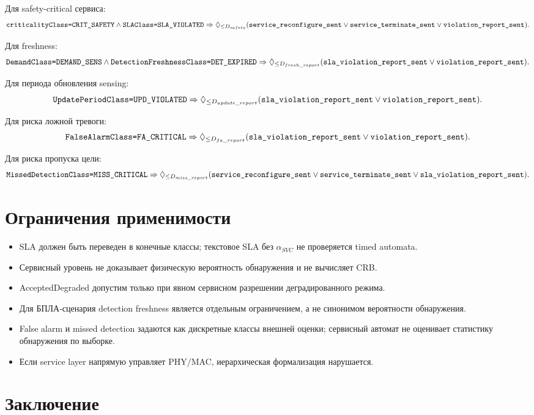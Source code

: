 \documentclass[10pt,a4paper]{article}
\newcommand{\code}[1]{\ifmmode\text{\ttfamily\detokenize{#1}}\else\texttt{\detokenize{#1}}\fi}
\begin{document}
Для safety-critical сервиса:
\[
\code{criticalityClass=CRIT_SAFETY}\land \code{SLAClass=SLA_VIOLATED}\Rightarrow
\Diamond_{\le D_{safety}}
(\code{service_reconfigure_sent}\vee \code{service_terminate_sent}\vee
\code{violation_report_sent}).
\]

Для freshness:
\[
\code{DemandClass=DEMAND_SENS}\land \code{DetectionFreshnessClass=DET_EXPIRED}
\Rightarrow
\Diamond_{\le D_{fresh\_report}}
(\code{sla_violation_report_sent}\vee \code{violation_report_sent}).
\]

Для периода обновления sensing:
\[
\code{UpdatePeriodClass=UPD_VIOLATED}\Rightarrow
\Diamond_{\le D_{update\_report}}
(\code{sla_violation_report_sent}\vee \code{violation_report_sent}).
\]

Для риска ложной тревоги:
\[
\code{FalseAlarmClass=FA_CRITICAL}\Rightarrow
\Diamond_{\le D_{fa\_report}}
(\code{sla_violation_report_sent}\vee \code{violation_report_sent}).
\]

Для риска пропуска цели:
\[
\code{MissedDetectionClass=MISS_CRITICAL}\Rightarrow
\Diamond_{\le D_{miss\_report}}
(\code{service_reconfigure_sent}\vee \code{service_terminate_sent}\vee
\code{sla_violation_report_sent}).
\]

\section{Ограничения применимости}

\begin{itemize}
  \item SLA должен быть переведен в конечные классы; текстовое SLA без \(\alpha_{SVC}\) не проверяется timed automata.
  \item Сервисный уровень не доказывает физическую вероятность обнаружения и не вычисляет CRB.
  \item AcceptedDegraded допустим только при явном сервисном разрешении деградированного режима.
  \item Для БПЛА-сценария detection freshness является отдельным ограничением, а не синонимом вероятности обнаружения.
  \item False alarm и missed detection задаются как дискретные классы внешней оценки; сервисный автомат не оценивает статистику обнаружения по выборке.
  \item Если service layer напрямую управляет PHY/MAC, иерархическая формализация нарушается.
\end{itemize}

\section{Заключение}
\end{document}
